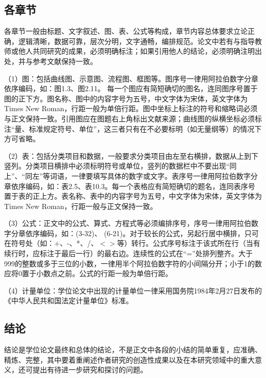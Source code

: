 \subsection{各章节}
各章节一般由标题、文字叙述、图、表、公式等构成，章节内容总体要求立论正确，逻辑清晰，数据可靠，层次分明，文字通畅，编排规范。论文中若有与指导教师或他人共同研究的成果，必须明确标注；如果引用他人的结论，必须明确注明出处，并与参考文献保持一致。
\par
（1）图：包括曲线图、示意图、流程图、框图等。图序号一律用阿拉伯数字分章依序编码，如：图1.3、图2.11。 每一个图应有简短确切的图名，连同图序号置于图的正下方。图名称、图中的内容字号为五号，中文字体为宋体，英文字体为Times New Roman，行距一般为单倍行距。图中坐标上标注的符号和缩略词必须与正文保持一致。引用图应在图题右上角标出文献来源；曲线图的纵横坐标必须标注“量、标准规定符号、单位”，这三者只有在不必要标明（如无量纲等）的情况下方可省略。
\par
（2）表：包括分类项目和数据，一般要求分类项目由左至右横排，数据从上到下竖列。分类项目横排中必须标明符号或单位，竖列的数据栏中不要出现“同上”、“同左”等词语，一律要填写具体的数字或文字。表序号一律用阿拉伯数字分章依序编码，如：表2.5、表10.3。每一个表格应有简短确切的题名，连同表序号置于表的正上方。表名称、表中的内容字号为五号，中文字体为宋体，英文字体为Times New Roman，行距一般与正文保持一致。
\par
（3）公式：正文中的公式、算式、方程式等必须编排序号，序号一律用阿拉伯数字分章依序编码，如：(3-32)、 (6-21)。对于较长的公式，另起行居中横排，只可在符号处（如：+、-、*、/、$<$$>$等）转行。公式序号标注于该式所在行（当有续行时，应标注于最后一行）的最右边。连续性的公式在“=”处排列整齐。大于999的整数或多于三位的小数，一律用半个阿拉伯数字符的小间隔分开；小于1的数应将0置于小数点之前。公式的行距一般为单倍行距。
\par
（4）计量单位：学位论文中出现的计量单位一律采用国务院1984年2月27日发布的《中华人民共和国法定计量单位》标准。
\subsection{结论}
结论是学位论文最终和总体的结论，不是正文中各段的小结的简单重复，应准确、精炼、完整，其中要着重阐述作者研究的创造性成果以及在本研究领域中的重大意义，还可提出有待进一步研究和探讨的问题。
